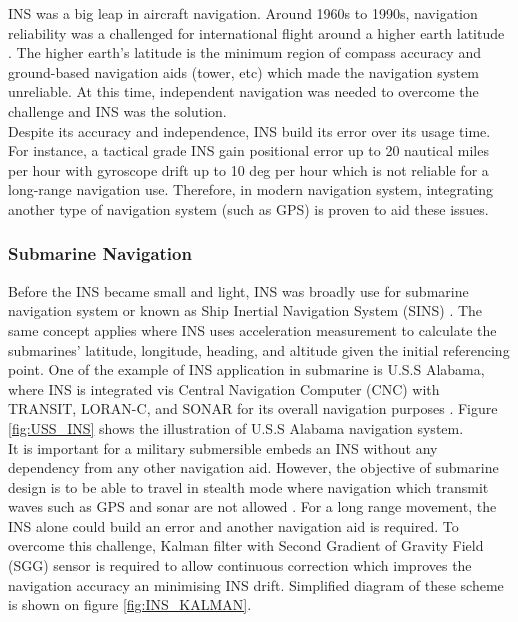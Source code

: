 \begin{figure}[!ht]
\begin{minipage}{.6\textwidth}
  \label{fig:InterfaceINS}
\end{minipage}
\end{figure}

\vspace{5mm}
\noindent INS was a big leap in aircraft navigation. Around 1960s to 1990s, navigation reliability was a challenged for international flight around a higher earth latitude \cite{1964InertialNavigation}. The higher earth's latitude is the minimum region of compass accuracy and ground-based navigation aids (tower, etc) which made the navigation system unreliable. At this time, independent navigation was needed to overcome the challenge and INS was the solution.\\

\noindent Despite its accuracy and independence, INS build its error over its usage time. For instance, a tactical grade INS gain positional error up to 20 nautical miles per hour with gyroscope drift up to 10 deg per hour which is not reliable for a long-range navigation use. Therefore, in modern navigation system, integrating another type of navigation system (such as GPS) is proven to aid these issues.

\subsubsection{Submarine Navigation}
Before the INS became small and light, INS was broadly use for submarine navigation system or known as Ship Inertial Navigation System (SINS) \cite{NATOSINS}. The same concept applies where INS uses acceleration measurement to calculate the submarines' latitude, longitude, heading, and altitude given the initial referencing point.  One of the example of INS application in submarine is U.S.S Alabama, where INS is integrated vis Central Navigation Computer (CNC) with TRANSIT, LORAN-C, and SONAR for its overall navigation purposes \cite{HowNavigation}. Figure \ref{fig:USS_INS} shows the illustration of U.S.S Alabama navigation system.\\

\noindent It is important for a military submersible embeds an INS without any dependency from any other navigation aid. However, the objective of submarine design is to be able to travel in stealth mode where navigation which transmit waves such as GPS and sonar are not allowed \cite{Rogobete2018UsingPositioning}. For a long range movement, the INS alone could build an error and another navigation aid is required. To overcome this challenge, Kalman filter with Second Gradient of Gravity Field (SGG) sensor is required to allow continuous correction which improves the navigation accuracy an minimising INS drift. Simplified diagram of these scheme is shown on figure \ref{fig:INS_KALMAN}.\\

